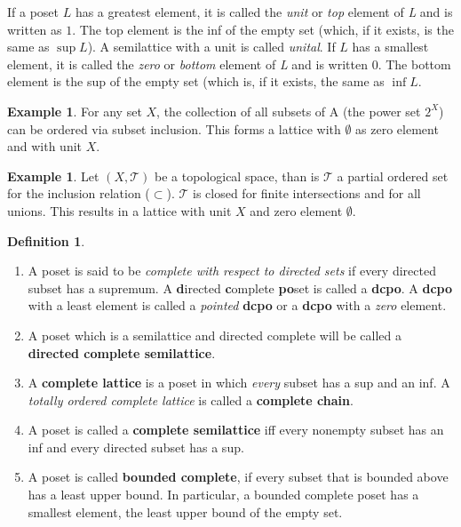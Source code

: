 \documentclass[a4paper,12pt]{article}
\theoremstyle{definition}
\newtheorem{example}[theorem]{Example}
\newtheorem{definition}[theorem]{Definition}
\begin{document}
If a poset $L$ has a greatest element, it is called the \emph{unit} or \emph{top} element of \emph{L} and is written as $1$. The top element is the inf of the empty set (which, if it exists, is the same as $\sup L$). A semilattice with a unit is called \emph{unital}. If $L$ has a smallest element, it is called the \emph{zero} or \emph{bottom} element of \emph{L} and is written 0. The bottom element is the sup of the empty set (which is, if it exists, the same as $\inf L$.
\begin{example}
For any set $X$, the collection of all subsets of A (the power set $2^X$) can be ordered via subset inclusion. This forms a lattice with $\emptyset$ as zero element and with unit $X$.
\end{example}
\begin{example}
Let $(X,\mathcal{T})$ be a topological space, than is $\mathcal{T}$ a partial ordered set for the inclusion relation ($\subset$). $\mathcal{T}$ is closed for finite intersections and for all unions. This results in a lattice with unit $X$ and zero element $\emptyset$.
\end{example}

\begin{definition}
\begin{enumerate}
  \item A poset is said to be \emph{complete with respect to directed sets} if every directed subset has a supremum. A \textbf{d}irected \textbf{c}omplete \textbf{po}set is called a \textbf{dcpo}. A \textbf{dcpo} with a least element is called a \emph{pointed} \textbf{dcpo} or a \textbf{dcpo} with a \emph{zero} element.
  \item A poset which is a semilattice and directed complete will be called a \textbf{directed complete semilattice}.
  \item A \textbf{complete lattice} is a poset in which \emph{every} subset has a sup and an inf. A \emph{totally ordered complete lattice} is called a \textbf{complete chain}.
  \item A poset is called a \textbf{complete semilattice}  iff every nonempty subset has an inf and every directed subset has a sup.
  \item A poset is called \textbf{bounded complete}, if every subset that is bounded above has a least upper bound. In particular, a bounded complete poset has a smallest element, the least upper bound of the empty set.
\end{enumerate}
\end{definition}
\end{document}
